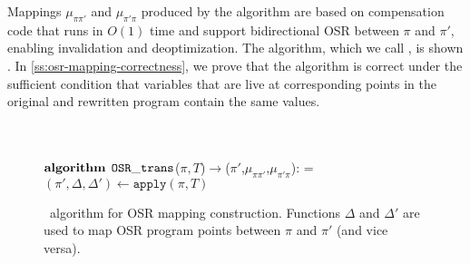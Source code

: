 \noindent Mappings $\mu_{\pi\pi'}$ and $\mu_{\pi'\pi}$ produced by the algorithm are based on compensation code that runs in $O(1)$ time and support bidirectional OSR between $\pi$ and $\pi'$, enabling invalidation and deoptimization. The algorithm, which we call \osrtrans, is shown . In \mysection\ref{ss:osr-mapping-correctness}, we prove that the algorithm is correct under the sufficient condition that variables that are live at corresponding points in the original and rewritten program contain the same values.

\ifdefined\noauthorea
\begin{figure}[ht!]
\IncMargin{2em}
\begin{algorithm}[H]
\DontPrintSemicolon
\LinesNumbered
\SetAlgoNoLine
\SetNlSkip{1em} 
\Indm\Indmm
\hrulefill\\
\nonl\vspace{-2mm}\hrulefill\\
\nonl$\mathbf{algorithm} \> \> \text{${\tt OSR\_trans}$}$($\pi, T$)$\rightarrow$($\pi'$,$\mu_{\pi\pi'}$,$\mu_{\pi'\pi}$):\;
\everypar={\nl}
\Indp\Indpp
\vspace{1mm} $(\pi',\Delta,\Delta')\gets \texttt{apply}(\pi,T)$\;
\;
\vspace{-2mm}
\Indm\Indmm
\nonl\hrulefill\vspace{1mm}\\
\DecMargin{0.5em}
\caption{\label{alg:osr-trans} \osrtrans\ algorithm for OSR mapping construction. Functions $\Delta$ and $\Delta'$ are used to map OSR program points between $\pi$ and $\pi'$ (and vice versa).}
\IncMargin{0.5em}
\end{algorithm} 
\end{figure}

